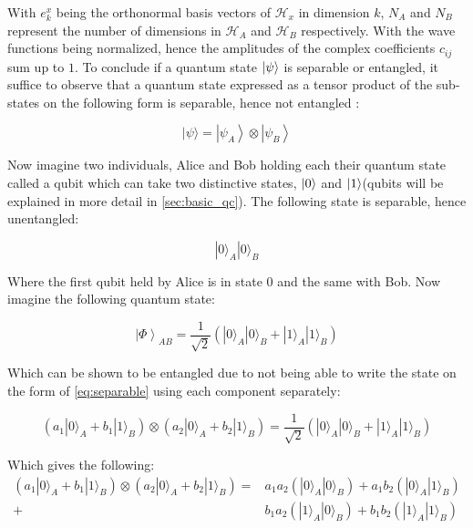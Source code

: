 \documentclass[../main.tex]{subfiles}
\begin{document}
With $e^x_k$ being the orthonormal basis vectors of $\mathcal{H}_x$ in dimension $k$, $N_A$ and $N_B$ represent the number of dimensions in $\mathcal{H}_A$ and $\mathcal{H}_B$ respectively. With the wave functions being normalized, hence the amplitudes of the complex coefficients $c_{ij}$ sum up to $1$. To conclude if a quantum state $\ket{\psi}$ is separable or entangled, it suffice to observe that a quantum state expressed as a tensor product of the sub-states on the following form is separable, hence not entangled \cite[ch.~3]{10.5555/3309066}:

\begin{equation}
|\psi\rangle=\left|\psi_{A}\right\rangle \otimes\left|\psi_{B}\right\rangle
\label{eq:separable}
\end{equation}

Now imagine two individuals, Alice and Bob holding each their quantum state called a qubit which can take two distinctive states, $\ket{0}$ and $\ket{1}$(qubits will be explained in more detail in \autoref{sec:basic_qc}). The following state is separable, hence unentangled:

\begin{equation*}
|0\rangle_{A}|0\rangle_{B}
\end{equation*}

Where the first qubit held by Alice is in state $0$ and the same with Bob. Now imagine the following quantum state:

\begin{equation}
\left|\Phi\right\rangle_{A B} = \frac{1}{\sqrt{2}}\left(|0\rangle_{A}|0\rangle_{B}+|1\rangle_{A}|1\rangle_{B}\right)
\label{eq:Bell_allice_bob}
\end{equation}

Which can be shown to be entangled due to not being able to write the state on the form of \autoref{eq:separable} using each component separately\cite[ch.~3]{gentle_intro_qc}:

\begin{equation}
\left(a_{1}|0\rangle_A+b_{1}|1\rangle_B\right) \otimes\left(a_{2}|0\rangle_A+b_{2}|1\rangle_B\right)=\frac{1}{\sqrt{2}}\left(|0\rangle_{A}|0\rangle_{B}+|1\rangle_{A}|1\rangle_{B}\right)
\label{eq:bell_separabel}
\end{equation}

Which gives the following:
\begin{equation*}
\begin{split}
    \left(a_{1}|0\rangle_A+b_{1}|1\rangle_B\right) \otimes\left(a_{2}|0\rangle_A+b_{2}|1\rangle_B\right)=& a_{1} a_{2}(|0\rangle_A |0\rangle_B)+a_{1} b_{2}(|0\rangle_A |1\rangle_B)\\+&b_{1} a_{2}(|1\rangle_A |0\rangle_B)+b_{1} b_{2}(|1\rangle_A |1\rangle_B)
\end{split}
\end{equation*}
\end{document}
